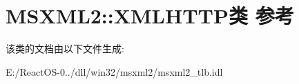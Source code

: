 \hypertarget{class_m_s_x_m_l2_1_1_x_m_l_h_t_t_p}{}\section{M\+S\+X\+M\+L2\+:\+:X\+M\+L\+H\+T\+T\+P类 参考}
\label{class_m_s_x_m_l2_1_1_x_m_l_h_t_t_p}


该类的文档由以下文件生成\+:\begin{DoxyCompactItemize}
\item 
E\+:/\+React\+O\+S-\/0../dll/win32/msxml2/msxml2\+\_\+tlb.\+idl\end{DoxyCompactItemize}
